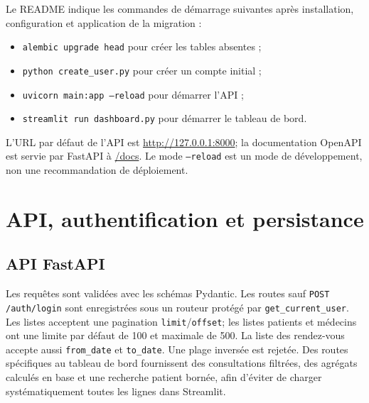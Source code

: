 \documentclass[11pt,a4paper]{report}
\newcommand{\code}[1]{\texttt{#1}}
\begin{document}
Le README indique les commandes de démarrage suivantes après installation,
configuration et application de la migration :
\begin{itemize}
  \item \code{alembic upgrade head} pour créer les tables absentes ;
  \item \code{python create\_user.py} pour créer un compte initial ;
  \item \code{uvicorn main:app --reload} pour démarrer l'API ;
  \item \code{streamlit run dashboard.py} pour démarrer le tableau de bord.
\end{itemize}
L'URL par défaut de l'API est \url{http://127.0.0.1:8000}; la documentation
OpenAPI est servie par FastAPI à \url{/docs}. Le mode \code{--reload} est un
mode de développement, non une recommandation de déploiement.

\chapter{API, authentification et persistance}
\section{API FastAPI}
Les requêtes sont validées avec les schémas Pydantic. Les routes sauf
\code{POST /auth/login} sont enregistrées sous un routeur protégé par
\code{get\_current\_user}. Les listes acceptent une pagination
\code{limit}/\code{offset}; les listes patients et médecins ont une limite par
défaut de 100 et maximale de 500. La liste des rendez-vous accepte aussi
\code{from\_date} et \code{to\_date}. Une plage inversée est rejetée.
Des routes spécifiques au tableau de bord fournissent des consultations
filtrées, des agrégats calculés en base et une recherche patient bornée, afin
d'éviter de charger systématiquement toutes les lignes dans Streamlit.
\end{document}
